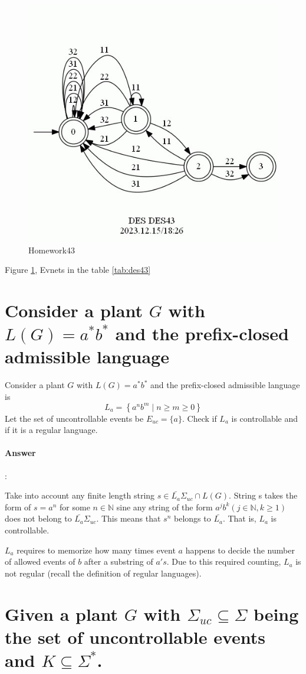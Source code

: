 \documentclass{article}
\begin{document}
\begin{figure}
  \centering
  \includegraphics[width=0.6\linewidth]{assets/DES43.jpg}
  \caption{Homework43}
  \label{fig:des43}
\end{figure}

Figure \ref{fig:des43}, Evnets in the table \ref{tab:des43}


\section{Consider a plant $G$ with $L(G)=a^* b^*$ and the prefix-closed admissible language}

Consider a plant $G$ with $L(G)=a^* b^*$ and the prefix-closed admissible language is
$$
L_a=\left\{a^n b^m \mid n \geq m \geq 0\right\}
$$
Let the set of uncontrollable events be $E_{u c}=\{a\}$. Check if $L_a$ is controllable and if it is a regular language.

\paragraph{Answer}:

Take into account any finite length string $s \in \bar{L_a}\Sigma_{uc} \cap L(G)$. String s takes the form of $s = a^n$ for some $n \in \mathbb{N}$ sine any string of the form $a^jb^k(j \in \mathbb{N}, k \geq 1)$ does not belong to $\bar{L_a}\Sigma_{uc}$. This means that $s^n$ belongs to $\bar{L_a}$. That is, $L_a$ is controllable.

$L_a$ requires to memorize how many times event $a$ happens to decide the number of allowed events of $b$ after a substring of $a\prime s$. Due to this required counting, $L_a$ is not regular (recall the definition of regular languages).

\section{Given a plant $G$ with $\Sigma_{u c} \subseteq \Sigma$ being the set of uncontrollable events and $K \subseteq \Sigma^*$.}
 
\end{document}
